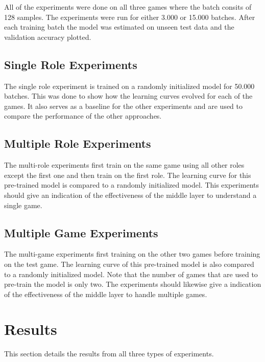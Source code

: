 \documentclass[twocolumn, letterpaper, 10 pt, conference]{ieeeconf}  %
\begin{document}
    All of the experiments were done on all three games where the batch consits of 128 samples. The experiments were run for either 3.000 or 15.000 batches. After each training batch the model was estimated on unseen test data and the validation accuracy plotted.  
    
    \subsection{Single Role Experiments}
        The single role experiment is trained on a randomly initialized model for 50.000 batches. This was done to show how the learning curves evolved for each of the games. It also serves as a baseline for the other experiments and are used to compare the performance of the other approaches. 
    
    \subsection{Multiple Role Experiments}
        The multi-role experiments first train on the same game using all other roles except the first one and then train on the first role. The learning curve for this pre-trained model is compared to a randomly initialized model. This experiments should give an indication of the effectiveness of the middle layer to understand a single game.
    
    \subsection{Multiple Game Experiments}
        The multi-game experiments first training on the other two games before training on the test game. The learning curve of this pre-trained model is also compared to a randomly initialized model. Note that the number of games that are used to pre-train the model is only two. The experiments should likewise give a indication of the effectiveness of the middle layer to handle multiple games. 


\section{Results}
This section details the results from all three types of experiments. 
\end{document}
